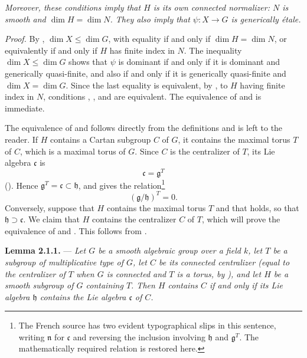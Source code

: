\textit{Moreover, these conditions imply that \(H\) is its own
connected normalizer: \(N\) is smooth and
\(\dim H=\dim N\). They also imply that \(\psi:X\to G\) is
generically étale.}

\noindent\textit{Proof.}
By , \(\dim X\leq\dim G\), with equality if and only if
\(\dim H=\dim N\), or equivalently if and only if \(H\) has finite
index in \(N\). The inequality \(\dim X\leq\dim G\) shows that
\(\psi\) is dominant if and only if it is dominant and generically
quasi-finite, and also if and only if it is generically quasi-finite
and \(\dim X=\dim G\). Since the last equality is equivalent, by
, to \(H\) having finite index in \(N\), conditions , , and
 are equivalent. The equivalence of  and  is
immediate.

The equivalence of  and  follows directly from the
definitions and is left to the reader. If \(H\) contains a Cartan
subgroup \(C\) of \(G\), it contains the maximal torus \(T\) of
\(C\), which is a maximal torus of \(G\). Since \(C\) is the
centralizer of \(T\), its Lie algebra \(\mathfrak c\) is
\[
  \mathfrak c=\mathfrak g^T
\]
(). Hence
\(\mathfrak g^T=\mathfrak c\subset\mathfrak h\), and  gives
the relation\footnote{The French source has two evident typographical
slips in this sentence, writing \(\mathfrak n\) for \(\mathfrak c\)
and reversing the inclusion involving \(\mathfrak h\) and
\(\mathfrak g^T\). The mathematically required relation is restored
here.}
\[
\tag{x}
  (\mathfrak g/\mathfrak h)^T=0.
\]
Conversely, suppose that \(H\) contains the maximal torus \(T\) and
that  holds, so that \(\mathfrak h\supset\mathfrak c\). We claim
that \(H\) contains the centralizer \(C\) of \(T\), which will prove
the equivalence of  and . This follows from .

\medskip
\noindent{}\textbf{Lemma 2.1.1.} ---
\textit{Let \(G\) be a smooth algebraic group over a field \(k\), let
\(T\) be a subgroup of multiplicative type of \(G\), let \(C\) be its
connected centralizer (equal to the centralizer of \(T\) when \(G\)
is connected and \(T\) is a torus, by ), and let \(H\) be
a smooth subgroup of \(G\) containing \(T\). Then \(H\) contains
\(C\) if and only if its Lie algebra \(\mathfrak h\) contains the Lie
algebra \(\mathfrak c\) of \(C\).}

